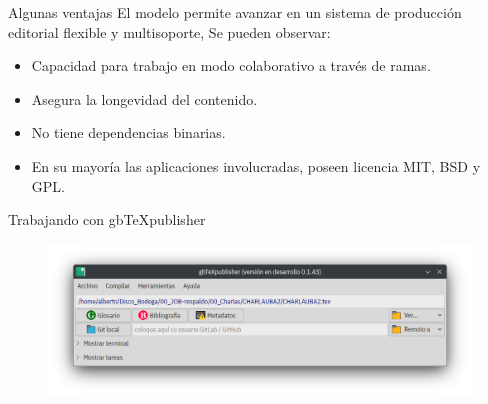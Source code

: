 \documentclass[14pt,aspectratio=169]{beamer}
\begin{document}

\begin{frame}{Algunas ventajas}
El modelo permite avanzar en un sistema de producción editorial flexible y multisoporte, Se pueden observar:

\begin{itemize}
	\item<2-> Capacidad para trabajo en modo colaborativo a través de ramas.
	\item<3-> Asegura la longevidad del contenido.
	\item<4-> No tiene dependencias binarias.
	\item<5-> En su mayoría las aplicaciones involucradas, poseen licencia MIT, BSD y GPL.
\end{itemize}
\end{frame}

\begin{frame}{Trabajando con gbTeXpublisher}
	\begin{figure}
		\centering
		\includegraphics[width=.8\textwidth]{captura.png}
	\end{figure}
\end{frame}

\end{document}
